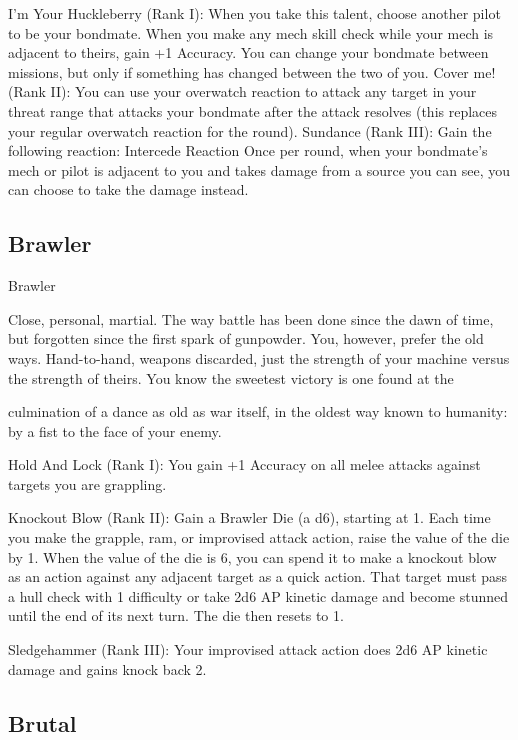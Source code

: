 I’m Your Huckleberry (Rank I): When you take this talent, choose another pilot to be your  
bondmate. When you make any mech skill check while your mech is adjacent to theirs, gain +1  
Accuracy. You can change your bondmate between missions, but only if something has changed  
between the two of you.  
Cover me! (Rank II): You can use your overwatch reaction to attack any target in your threat  
range that attacks your bondmate after the attack resolves (this replaces your regular overwatch  
reaction for the round).  
Sundance (Rank III): Gain the following reaction:  
         Intercede  
         Reaction  
         Once per round, when your bondmate’s mech or pilot is adjacent to you and takes  
         damage from a source you can see, you can choose to take the damage instead.  
\subsection{Brawler}

                                                     Brawler  

Close, personal, martial. The way battle has been done since the dawn of time, but forgotten since the first  
spark of gunpowder. You, however, prefer the old ways. Hand-to-hand, weapons discarded, just the  
strength of your machine versus the strength of theirs. You know the sweetest victory is one found at the  

culmination of a dance as old as war itself, in the oldest way known to humanity: by a fist to the face of  
your enemy.   

Hold And Lock (Rank I): You gain +1 Accuracy on all melee attacks against targets you are  
grappling.
 
Knockout Blow (Rank II): Gain a Brawler Die (a d6), starting at 1. Each time you make the  
grapple, ram, or improvised attack action, raise the value of the die by 1. When the value of the  
die is 6, you can spend it to make a knockout blow as an action against any adjacent target as a  
quick action. That target must pass a hull check with 1 difficulty or take 2d6 AP kinetic damage  
and become stunned until the end of its next turn. The die then resets to 1.
 
Sledgehammer (Rank III): Your improvised attack action does 2d6 AP kinetic damage and gains  
knock back 2.
 
\subsection{Brutal}

